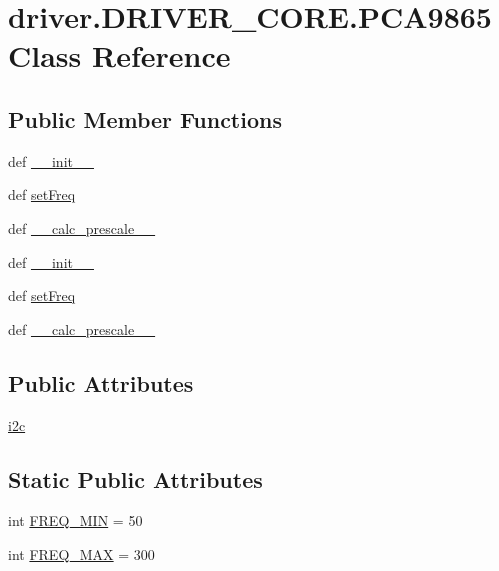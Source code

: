 \hypertarget{classdriver_1_1DRIVER__CORE_1_1PCA9865}{}\section{driver.\+D\+R\+I\+V\+E\+R\+\_\+\+C\+O\+R\+E.\+P\+C\+A9865 Class Reference}
\label{classdriver_1_1DRIVER__CORE_1_1PCA9865}
\subsection*{Public Member Functions}
\begin{DoxyCompactItemize}
\item 
def \hyperlink{classdriver_1_1DRIVER__CORE_1_1PCA9865_ae727575a3372b8b4d90ffa314081c489}{\+\_\+\+\_\+init\+\_\+\+\_\+}
\item 
def \hyperlink{classdriver_1_1DRIVER__CORE_1_1PCA9865_a425edd2aa5693f5fea64d0aec65f77e8}{set\+Freq}
\item 
def \hyperlink{classdriver_1_1DRIVER__CORE_1_1PCA9865_a2482e9c19788095bfc47ebdb62b4903d}{\+\_\+\+\_\+calc\+\_\+prescale\+\_\+\+\_\+}
\item 
def \hyperlink{classdriver_1_1DRIVER__CORE_1_1PCA9865_ae727575a3372b8b4d90ffa314081c489}{\+\_\+\+\_\+init\+\_\+\+\_\+}
\item 
def \hyperlink{classdriver_1_1DRIVER__CORE_1_1PCA9865_a425edd2aa5693f5fea64d0aec65f77e8}{set\+Freq}
\item 
def \hyperlink{classdriver_1_1DRIVER__CORE_1_1PCA9865_a2482e9c19788095bfc47ebdb62b4903d}{\+\_\+\+\_\+calc\+\_\+prescale\+\_\+\+\_\+}
\end{DoxyCompactItemize}
\subsection*{Public Attributes}
\begin{DoxyCompactItemize}
\item 
\hyperlink{classdriver_1_1DRIVER__CORE_1_1PCA9865_a3a4b2748c61f79822d6602c941535bd2}{i2c}
\end{DoxyCompactItemize}
\subsection*{Static Public Attributes}
\begin{DoxyCompactItemize}
\item 
int \hyperlink{classdriver_1_1DRIVER__CORE_1_1PCA9865_ad9aef9648195aa00f5ae496992073930}{F\+R\+E\+Q\+\_\+\+M\+I\+N} = 50
\item 
int \hyperlink{classdriver_1_1DRIVER__CORE_1_1PCA9865_a5394eec714130c246fe47c35a2af683a}{F\+R\+E\+Q\+\_\+\+M\+A\+X} = 300
\end{DoxyCompactItemize}


